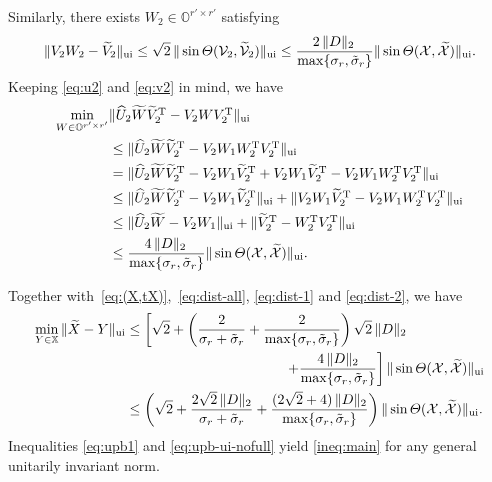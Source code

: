 \documentclass[11pt]{article}
\def\bbO{\mathbb{O}}
\def\bbX{\mathbb{X}}
\def\cV{{\cal V}}
\def\cX{{\cal X}}
\DeclareMathOperator{\ui}{ui}
\DeclareMathOperator{\T}{T}
\DeclareMathOperator{\UI}{ui}
\def\wtd{\widetilde}
\def\what{\widehat}
\theoremstyle{definition}
\numberwithin{equation}{section}
\numberwithin{figure}{section}
\numberwithin{table}{section}
\begin{document}
Similarly, there exists $W_2\in\bbO^{r'\times r'}$ satisfying
\begin{equation} \label{eq:v2}
   \|V_2W_2-\wtd V_2\|_{\UI}\le\sqrt 2\,\|\sin\Theta(\cV_2,\wtd\cV_2)\|_{ \ui}\le
   \frac{2\,\|D\|_2\,}{\max\{ \sigma_r,\tilde\sigma_r\}}\|\sin\Theta(\cX,\wtd\cX)\|_{ \ui}.
\end{equation}
Keeping \eqref{eq:u2} and \eqref{eq:v2} in mind, we have
\begin{align}
\min_{W\in\bbO^{r'\times r'}}&\|\what U_2\wtd W\wtd V_2^{\T}- V_2WV_2^{\T}\|_{\UI} \notag \\
         &\le\|\what U_2\wtd W\wtd V_2^{\T}- V_2W_1W_2^{\T}V_2^{\T}\|_{\UI}  \notag\\
 &=\|\what U_2\wtd W\wtd V_2^{\T}- V_2W_1\wtd V_2^{\T}+V_2W_1\wtd V_2^{\T}-V_2W_1W_2^{\T}V_2^{\T}\|_{\UI} \notag \\
 &\le\|\what U_2\wtd W\wtd V_2^{\T}- V_2W_1\wtd V_2^{\T}\|_{\UI}
       +\|V_2W_1\wtd V_2^{\T}-V_2W_1W_2^{\T}V_2^{\T}\|_{\UI} \notag \\
 &\le\|\what U_2\wtd W- V_2W_1\|_{\UI}+\|\wtd V_2^{\T}-W_2^{\T} V_2^{\T}\|_{\UI} \nonumber\\
       &\le\frac{4\,\|D\|_2\,}{\max\{ \sigma_r,\tilde\sigma_r\}}\|\sin\Theta(\cX,\wtd\cX)\|_{\UI}.
           \label{eq:dist-2}
\end{align}

Together with~\eqref{eq:(X,tX)},~\eqref{eq:dist-all}, \eqref{eq:dist-1} and \eqref{eq:dist-2}, we have
\begin{align}
\min_{Y\in\bbX}\|\wtd X-Y\|_{\UI}
    &\le\left[\sqrt 2+\left(\frac{2}{\sigma_r+\tilde\sigma_r}
         +\frac{2}{\max\{\sigma_r,\tilde\sigma_r\}}\right)\sqrt 2\,\|D\|_2\right. \notag \\
    &\hspace{4cm}\left.     +\frac{4\,\|D\|_2}{\max\{ \sigma_r,\tilde\sigma_r\}}\right]\|\sin\Theta(\cX,\wtd\cX)\|_{\UI} \notag\\
    &\le\left(\sqrt 2+\frac{2\sqrt 2\,\|D\|_2}{\sigma_r+\tilde\sigma_r}
    +\frac{(2\sqrt 2+4)\,\|D\|_2}{\max\{\sigma_r,\tilde\sigma_r\}}\right)\|\sin\Theta(\cX,\wtd\cX)\|_{\UI}.
        \label{eq:upb-ui-nofull}
\end{align}
Inequalities \eqref{eq:upb1} and \eqref{eq:upb-ui-nofull} yield \eqref{ineq:main} for any general unitarily invariant norm.
\end{document}
